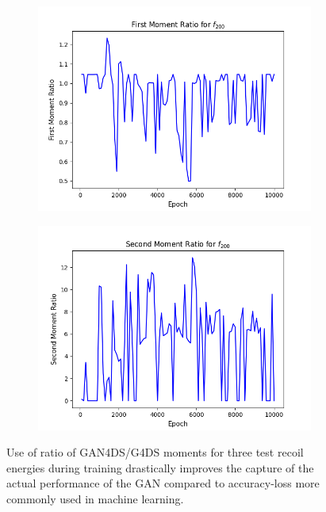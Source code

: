 \documentclass[11pt]{article} %
\begin{document}
\begin{figure}[H]
\begin{minipage}{\textwidth}
\begin{subfigure}{.5\textwidth}
      \includegraphics[scale=0.6]{./images/moment_1_f200like.png}
  \end{subfigure}
  \begin{subfigure}{.5\textwidth}
      \includegraphics[scale=0.6]{./images/moment_2_f200like.png}
  \end{subfigure}
\end{minipage}
\caption{Use of ratio of GAN4DS/G4DS moments for three test recoil energies during training drastically improves the capture of the actual performance of the GAN
compared to accuracy-loss more commonly used in machine learning.}
\label{fig:moments}
\end{figure}
\end{document}

